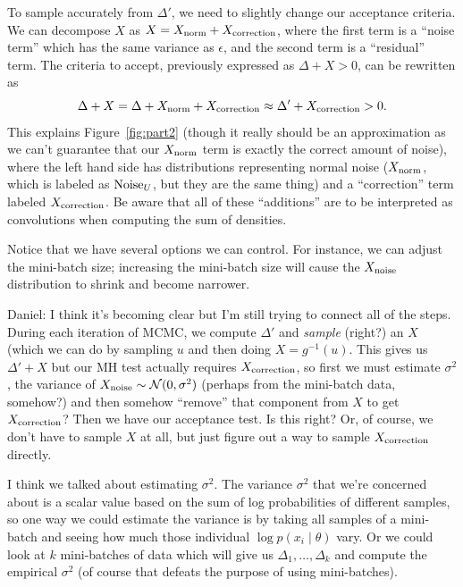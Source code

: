 \documentclass{article}
\begin{document}
To sample accurately from $\Delta'$, we need to slightly change our acceptance criteria. We can
decompose $X$ as $X = X_{\rm norm} +X_{\rm correction}$, where the first term is a ``noise term''
which has the same variance as $\epsilon$, and the second term is a ``residual'' term. The criteria
to accept, previously expressed as $\Delta + X > 0$, can be rewritten as
\begin{equation}\label{eq:criteria}
\Delta + X = \Delta + X_{\rm norm} + X_{\rm correction} \approx \Delta' + X_{\rm correction} >0.
\end{equation}
This explains Figure~\ref{fig:part2} (though it really should be an approximation as we can't guarantee that our $X_{\rm norm}$ term is exactly the correct amount of noise), where the left hand side has distributions representing normal
noise ($X_{\rm norm}$, which is labeled as ${\rm Noise}_U$, but they are the same thing) and a
``correction'' term labeled $X_{\rm correction}$. Be aware that all of these ``additions'' are to be
interpreted as convolutions when computing the sum of densities.

Notice that we have several options we can control. For instance, we can adjust the mini-batch size;
increasing the mini-batch size will cause the $X_{\rm noise}$ distribution to shrink and become
narrower.

{\color{blue} Daniel: I think it's becoming clear but I'm still trying to connect all of the steps.
During each iteration of MCMC, we compute $\Delta'$ and \emph{sample} (right?) an $X$ (which we can
do by sampling $u$ and then doing $X = g^{-1}(u)$. This gives us $\Delta' + X$ but our MH test
    actually requires $X_{\rm correction}$, so first we must estimate $\sigma^2$, the variance of
    $X_{\rm noise} \sim \mathcal{N}(0, \sigma^2)$ (perhaps from the mini-batch data, somehow?) and
    then somehow ``remove'' that component from $X$ to get $X_{\rm correction}$? Then we have our
    acceptance test. Is this right? Or, of course, we don't have to sample $X$ at all, but just
    figure out a way to sample $X_{\rm correction}$ directly.

I think we talked about estimating $\sigma^2$. The variance $\sigma^2$ that we're concerned about is
a scalar value based on the sum of log probabilities of different samples, so one way we could
estimate the variance is by taking all samples of a mini-batch and seeing how much those individual
$\log p(x_i \mid \theta)$ vary. Or we could look at $k$ mini-batches of data which will give us
$\Delta_1, \ldots, \Delta_k$ and compute the empirical $\sigma^2$ (of course that defeats the
purpose of using mini-batches).  }
\end{document}
